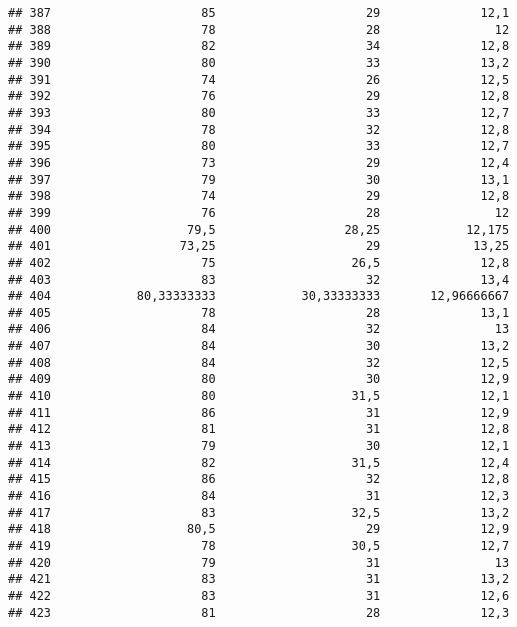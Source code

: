 \documentclass[
]{article}
\begin{document}
\begin{verbatim}
## 387                     85                     29              12,1
## 388                     78                     28                12
## 389                     82                     34              12,8
## 390                     80                     33              13,2
## 391                     74                     26              12,5
## 392                     76                     29              12,8
## 393                     80                     33              12,7
## 394                     78                     32              12,8
## 395                     80                     33              12,7
## 396                     73                     29              12,4
## 397                     79                     30              13,1
## 398                     74                     29              12,8
## 399                     76                     28                12
## 400                   79,5                  28,25            12,175
## 401                  73,25                     29             13,25
## 402                     75                   26,5              12,8
## 403                     83                     32              13,4
## 404            80,33333333            30,33333333       12,96666667
## 405                     78                     28              13,1
## 406                     84                     32                13
## 407                     84                     30              13,2
## 408                     84                     32              12,5
## 409                     80                     30              12,9
## 410                     80                   31,5              12,1
## 411                     86                     31              12,9
## 412                     81                     31              12,8
## 413                     79                     30              12,1
## 414                     82                   31,5              12,4
## 415                     86                     32              12,8
## 416                     84                     31              12,3
## 417                     83                   32,5              13,2
## 418                   80,5                     29              12,9
## 419                     78                   30,5              12,7
## 420                     79                     31                13
## 421                     83                     31              13,2
## 422                     83                     31              12,6
## 423                     81                     28              12,3

\end{verbatim}
\end{document}
